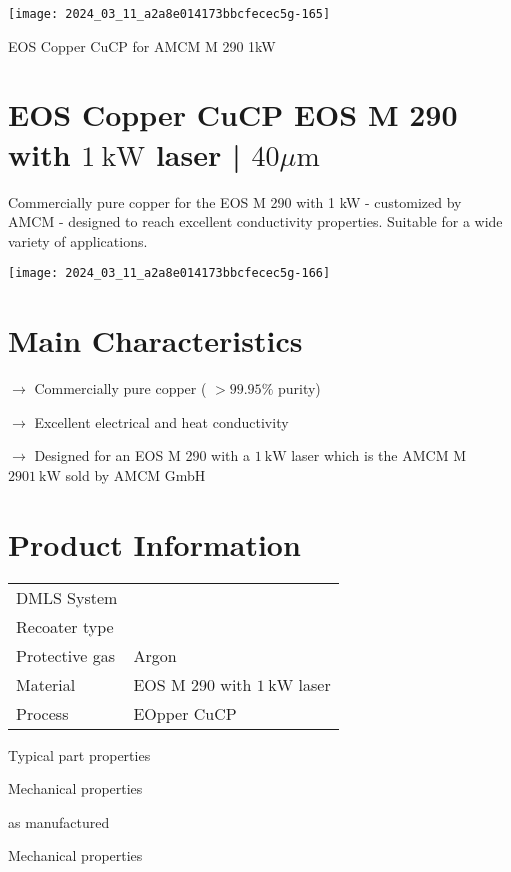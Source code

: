 \documentclass[10pt]{article}
\begin{document}
\begin{center}
\texttt{[image: 2024\_03\_11\_a2a8e014173bbcfecec5g-165]}
\end{center}

EOS Copper CuCP for AMCM M 290 1kW

\section*{EOS Copper CuCP EOS M 290 with $1 \mathrm{~kW}$ laser | $40 \mu \mathrm{m}$}
Commercially pure copper for the EOS M 290 with 1 kW - customized by AMCM - designed to reach excellent conductivity properties. Suitable for a wide variety of applications.

\begin{center}
\texttt{[image: 2024\_03\_11\_a2a8e014173bbcfecec5g-166]}
\end{center}

\section*{Main Characteristics}
$\longrightarrow$ Commercially pure copper ( $>99.95 \%$ purity)

$\longrightarrow$ Excellent electrical and heat conductivity

$\longrightarrow$ Designed for an EOS M 290 with a $1 \mathrm{~kW}$ laser which is the AMCM M $2901 \mathrm{~kW}$ sold by AMCM GmbH

\section*{Product Information}
\begin{center}
\begin{tabular}{ll}
DMLS System &  \\
Recoater type &  \\
Protective gas & Argon \\
Material & EOS M 290 with $1 \mathrm{~kW}$ laser \\
Process & EOpper CuCP \\
\hline
\end{tabular}
\end{center}

Typical part properties

Mechanical properties

as manufactured

Mechanical properties
\end{document}
